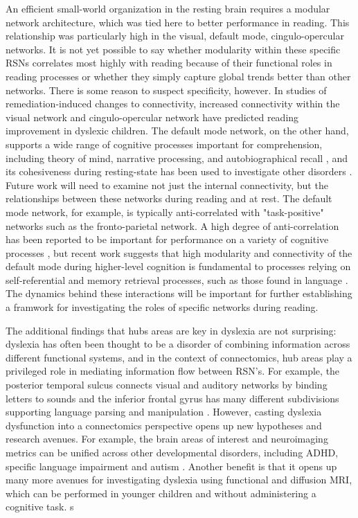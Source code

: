 An efficient small-world organization in the resting brain requires a modular network architecture, which was tied here to better performance in reading. This relationship was particularly high in the visual, default mode, cingulo-opercular networks. It is not yet possible to say whether modularity within these specific RSNs correlates most highly with reading because of their functional roles in reading processes or whether they simply capture global trends better than other networks. There is some reason to suspect specificity, however. In studies of remediation-induced changes to connectivity, increased connectivity within the visual network \cite{Koyama2013} and cingulo-opercular network \cite{HorowitzKraus2015} have predicted reading improvement in dyslexic children. The default mode network, on the other hand, supports a wide range of cognitive processes important for comprehension, including theory of mind, narrative processing, and autobiographical recall \cite{Buckner2008, AbdulSabur2014}, and its cohesiveness during resting-state has been used to investigate other disorders \cite{Uddin2008}. Future work will need to examine not just the internal connectivity, but the relationships between these networks during reading and at rest. The default mode network, for example, is typically anti-correlated with "task-positive" networks such as the fronto-parietal network. A high degree of anti-correlation has been reported to be important for performance on a variety of cognitive processes \cite{Fox2005, Keller2015}, but recent work suggests that high modularity and connectivity of the default mode during higher-level cognition is fundamental to processes relying on self-referential and memory retrieval processes, such as those found in language \cite{Vatansever2015}. The dynamics behind these interactions will be important for further establishing a framwork for investigating the roles of specific networks during reading. 

The additional findings that hubs areas are key in dyslexia are not surprising: dyslexia has often been thought to be a disorder of combining information across different functional systems, and in the context of connectomics, hub areas play a privileged role in mediating information flow between RSN’s. For example, the posterior temporal sulcus connects visual and auditory networks by binding letters to sounds \cite{Blau2010, VanAtteveldt2009} and the inferior frontal gyrus has many different subdivisions supporting language parsing and manipulation \cite{Hagoort2005}. However, casting dyslexia dysfunction into a connectomics perspective opens up new hypotheses and research avenues. For example, the brain areas of interest and neuroimaging metrics can be unified across other developmental disorders, including ADHD, specific language impairment and autism \cite{Stam2014}. Another benefit is that it opens up many more avenues for investigating dyslexia using functional and diffusion MRI, which can be performed in younger children and without administering a cognitive task. 
s
